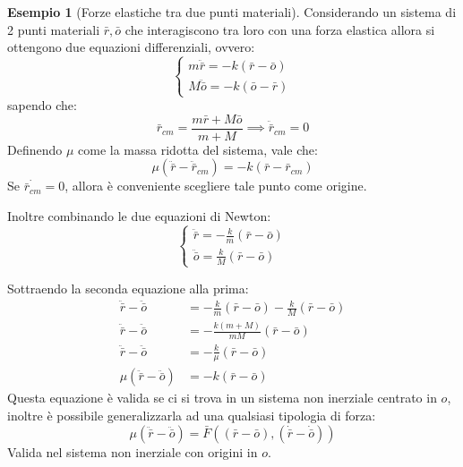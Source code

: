\documentclass[11pt, a4paper, openright]{book}
\theoremstyle{plain}
\theoremstyle{definition}
\newtheorem{esempio}[teorema]{Esempio}
\theoremstyle{remark}
\begin{document}
\begin{esempio}[Forze elastiche tra due punti materiali]
    Considerando un sistema di 2 punti materiali $\bar{r}, \bar{o}$ che interagiscono tra loro con una forza elastica allora si ottengono due equazioni differenziali, ovvero:
    \begin{equation}
        \begin{cases}
            m\ddot{\bar{r}} = -k(\bar{r} - \bar{o}) \\
            M\ddot{\bar{o}} = -k(\bar{o} - \bar{r}) 
        \end{cases}
    \end{equation}
    sapendo che:
    \begin{equation}
        \bar{r}_{cm} = \frac{m\bar{r} + M\bar{o}}{m + M} \implies \ddot{\bar{r}}_{cm} = 0
    \end{equation}
    Definendo $\mu$ come la massa ridotta del sistema, vale che:
    \begin{equation}
        \mu(\ddot{\bar{r}} - \ddot{\bar{r}}_{cm}) = -k(\bar{r} - \bar{r}_{cm})
    \end{equation}
    Se $\dot{\bar{r}_{cm}} = 0$, allora è conveniente scegliere tale punto come origine.
    
    Inoltre combinando le due equazioni di Newton:
    \begin{equation}
        \begin{cases}
            \ddot{\bar{r}} = -\frac{k}{m}(\bar{r} - \bar{o}) \\
            \ddot{\bar{o}} = \frac{k}{M}(\bar{r} - \bar{o})
        \end{cases}
    \end{equation}

    Sottraendo la seconda equazione alla prima:
    \begin{align}
        \ddot{\bar{r}} - \ddot{\bar{o}} & =  -\frac{k}{m}(\bar{r} - \bar{o}) - \frac{k}{M}(\bar{r} - \bar{o}) \\
        \ddot{\bar{r}} - \ddot{\bar{o}} & =  -\frac{k(m + M)}{mM}(\bar{r} - \bar{o})\\
        \ddot{\bar{r}} - \ddot{\bar{o}} & =  -\frac{k}{\mu}(\bar{r} - \bar{o})\\
        \mu(\ddot{\bar{r}} - \ddot{\bar{o}}) & = -k(\bar{r} - \bar{o})
    \end{align}
    Questa equazione è valida se ci si trova in un sistema non inerziale centrato in $o$, inoltre è possibile generalizzarla ad una qualsiasi tipologia di forza:
    \begin{equation}
        \mu(\ddot{\bar{r}} - \ddot{\bar{o}}) = \bar{F}((\bar{r} - \bar{o}), (\dot{\bar{r}} - \dot{\bar{o}}))
    \end{equation}
    Valida nel sistema non inerziale con origini in $o$.
\end{esempio}
\end{document}
